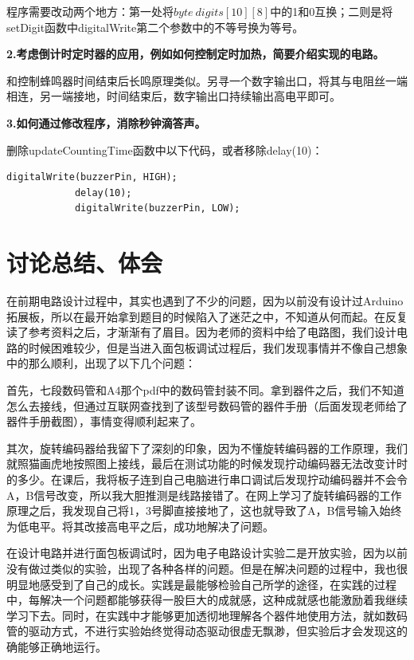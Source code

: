 \documentclass{../source/zjureport}
\begin{document}
        程序需要改动两个地方：第一处将$byte\  digits[10][8]$中的1和0互换；二则是将setDigit函数中digitalWrite第二个参数中的不等号换为等号。


        \textbf{2.考虑倒计时定时器的应用，例如如何控制定时加热，简要介绍实现的电路。}
            

        和控制蜂鸣器时间结束后长鸣原理类似。另寻一个数字输出口，将其与电阻丝一端相连，另一端接地，时间结束后，数字输出口持续输出高电平即可。


        \textbf{3.如何通过修改程序，消除秒钟滴答声。}


        删除updateCountingTime函数中以下代码，或者移除delay(10)：
        \newpage
        \begin{lstlisting}[name=待删除代码]
            digitalWrite(buzzerPin, HIGH);
            delay(10);
            digitalWrite(buzzerPin, LOW);
        \end{lstlisting}


    \section{讨论总结、体会}
    在前期电路设计过程中，其实也遇到了不少的问题，因为以前没有设计过Arduino拓展板，所以在最开始拿到题目的时候陷入了迷茫之中，不知道从何而起。在反复读了参考资料之后，才渐渐有了眉目。因为老师的资料中给了电路图，我们设计电路的时候困难较少，但是当进入面包板调试过程后，我们发现事情并不像自己想象中的那么顺利，出现了以下几个问题：


    首先，七段数码管和A4那个pdf中的数码管封装不同。拿到器件之后，我们不知道怎么去接线，但通过互联网查找到了该型号数码管的器件手册（后面发现老师给了器件手册截图），事情变得顺利起来了。
    

    其次，旋转编码器给我留下了深刻的印象，因为不懂旋转编码器的工作原理，我们就照猫画虎地按照图上接线，最后在测试功能的时候发现拧动编码器无法改变计时的多少。在课后，我将板子连到自己电脑进行串口调试后发现拧动编码器并不会令A，B信号改变，所以我大胆推测是线路接错了。在网上学习了旋转编码器的工作原理之后，我发现自己将1，3号脚直接接地了，这也就导致了A，B信号输入始终为低电平。将其改接高电平之后，成功地解决了问题。
    

    在设计电路并进行面包板调试时，因为电子电路设计实验二是开放实验，因为以前没有做过类似的实验，出现了各种各样的问题。但是在解决问题的过程中，我也很明显地感受到了自己的成长。实践是最能够检验自己所学的途径，在实践的过程中，每解决一个问题都能够获得一股巨大的成就感，这种成就感也能激励着我继续学习下去。同时，在实践中才能够更加透彻地理解各个器件地使用方法，就如数码管的驱动方式，不进行实验始终觉得动态驱动很虚无飘渺，但实验后才会发现这的确能够正确地运行。
\end{document}
